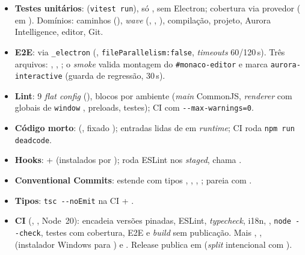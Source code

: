 \begin{itemize}[nosep]
  \item \textbf{Testes unitários}:  (\lstinline|vitest run|), só , sem Electron; cobertura via provedor  ( em ). Domínios: caminhos (), \emph{wave} (, , ), compilação, projeto, Aurora Intelligence, editor, Git.
  \item \textbf{E2E}:  via \lstinline|_electron| (, \lstinline|fileParallelism:false|, \emph{timeouts} 60/120\,s). Três arquivos: , , ; o \emph{smoke} valida montagem do \lstinline|#monaco-editor| e marca \lstinline|aurora-interactive| (guarda de regressão, 30\,s).
  \item \textbf{Lint}:  9 \emph{flat config} (), blocos por ambiente (\emph{main} CommonJS, \emph{renderer} com globais de \lstinline|window| , preloads, testes); CI com \lstinline|--max-warnings=0|.
  \item \textbf{Código morto}:  (, fixado ); entradas lidas de  em \emph{runtime}; CI roda \lstinline|npm run deadcode|.
  \item \textbf{Hooks}: + (instalados por );  roda ESLint nos \emph{staged},  chama .
  \item \textbf{Conventional Commits}:  estende  com tipos , , , ; pareia com .
  \item \textbf{Tipos}: \lstinline|tsc --noEmit| na CI + .
  \item \textbf{CI} (, , Node~20):  encadeia versões pinadas, ESLint, \emph{typecheck}, i18n, , \lstinline|node --check|, testes com cobertura, E2E e \emph{build} sem publicação. Mais , ,  (instalador Windows para ) e . Release publica em  (\emph{split} intencional com ).
\end{itemize}

